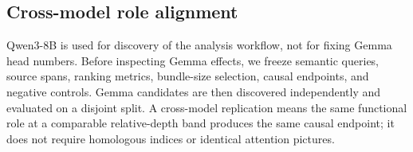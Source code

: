 \subsection{Cross-model role alignment}

Qwen3-8B is used for discovery of the analysis workflow, not for fixing Gemma head numbers. Before inspecting Gemma effects, we freeze semantic queries, source spans, ranking metrics, bundle-size selection, causal endpoints, and negative controls. Gemma candidates are then discovered independently and evaluated on a disjoint split. A cross-model replication means the same functional role at a comparable relative-depth band produces the same causal endpoint; it does not require homologous indices or identical attention pictures.

